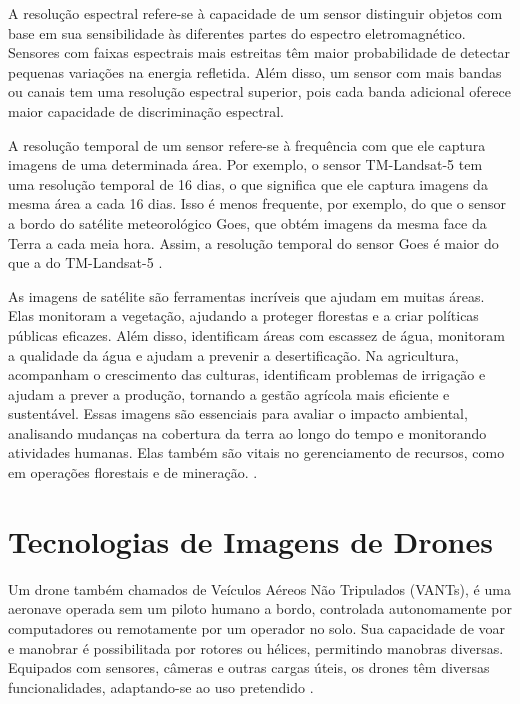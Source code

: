 \documentclass[
    12pt,                   %
    openright,              %
    oneside,                %
    a4paper,                %
    sumario=tradicional,    %
    english,                %
    brazil,                 %
    ]{abntex2}
\begin{document}
    A resolução espectral refere-se à capacidade de um sensor distinguir objetos com base em sua sensibilidade às diferentes partes do espectro eletromagnético. Sensores com faixas espectrais mais estreitas têm maior probabilidade de detectar pequenas variações na energia refletida. Além disso, um sensor com mais bandas ou canais tem uma resolução espectral superior, pois cada banda adicional oferece maior capacidade de discriminação espectral.

    A resolução temporal de um sensor refere-se à frequência com que ele captura imagens de uma determinada área. Por exemplo, o sensor TM-Landsat-5 tem uma resolução temporal de 16 dias, o que significa que ele captura imagens da mesma área a cada 16 dias. Isso é menos frequente, por exemplo, do que o sensor a bordo do satélite meteorológico Goes, que obtém imagens da mesma face da Terra a cada meia hora. Assim, a resolução temporal do sensor Goes é maior do que a do TM-Landsat-5 \cite{florenzano2007iniciaccao}.


    As imagens de satélite são ferramentas incríveis que ajudam em muitas áreas. Elas monitoram a vegetação, ajudando a proteger florestas e a criar políticas públicas eficazes. Além disso, identificam áreas com escassez de água, monitoram a qualidade da água e ajudam a prevenir a desertificação. Na agricultura, acompanham o crescimento das culturas, identificam problemas de irrigação e ajudam a prever a produção, tornando a gestão agrícola mais eficiente e sustentável. Essas imagens são essenciais para avaliar o impacto ambiental, analisando mudanças na cobertura da terra ao longo do tempo e monitorando atividades humanas. Elas também são vitais no gerenciamento de recursos, como em operações florestais e de mineração. \cite{geoinova2024, wu2024fine}.

\section{Tecnologias de Imagens de Drones}
    Um drone também chamados de Veículos Aéreos Não 
    Tripulados (VANTs), é uma aeronave operada sem um piloto humano a bordo, controlada autonomamente por computadores ou remotamente por um operador no solo\cite{Phang2023}. Sua capacidade de voar e manobrar é possibilitada por rotores ou hélices, permitindo manobras diversas. Equipados com sensores, câmeras e outras cargas úteis, os drones têm diversas funcionalidades, adaptando-se ao uso pretendido \cite{drones8040127}.
\end{document}
